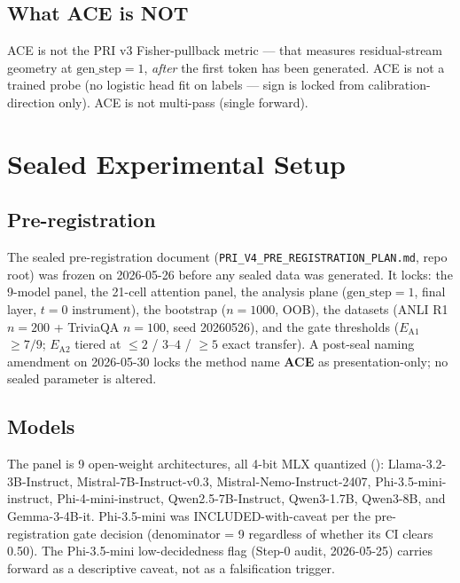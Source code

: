 \documentclass[10pt, letterpaper]{article}
\newcommand{\ea}[1]{$E_{\text{A}#1}$}
\begin{document}
\subsection{What ACE is NOT}
\label{sec:method:not}

ACE is not the PRI v3 Fisher-pullback metric --- that measures
residual-stream geometry at $\text{gen\_step}{=}1$, \emph{after} the
first token has been generated. ACE is not a trained probe (no
logistic head fit on labels --- sign is locked from
calibration-direction only). ACE is not multi-pass (single forward).

\section{Sealed Experimental Setup}
\label{sec:setup}

\subsection{Pre-registration}

The sealed pre-registration document
(\texttt{PRI\_V4\_PRE\_REGISTRATION\_PLAN.md}, repo root) was frozen
on 2026-05-26 before any sealed data was generated. It locks: the
9-model panel, the 21-cell attention panel, the analysis plane
($\text{gen\_step}{=}1$, final layer, $t{=}0$ instrument), the
bootstrap ($n{=}1000$, OOB), the datasets (ANLI R1 $n{=}200$ +
TriviaQA $n{=}100$, seed 20260526), and the gate thresholds
(\ea{1} $\geq 7/9$; \ea{2} tiered at $\leq 2$ / $3$--$4$ / $\geq 5$
exact transfer). A post-seal naming amendment on 2026-05-30 locks the
method name \textbf{ACE} as presentation-only; no sealed parameter is
altered.

\subsection{Models}

The panel is 9 open-weight architectures, all 4-bit MLX quantized
(\citealp{mlxframework}): Llama-3.2-3B-Instruct,
Mistral-7B-Instruct-v0.3, Mistral-Nemo-Instruct-2407,
Phi-3.5-mini-instruct, Phi-4-mini-instruct, Qwen2.5-7B-Instruct,
Qwen3-1.7B, Qwen3-8B, and Gemma-3-4B-it. Phi-3.5-mini was
INCLUDED-with-caveat per the pre-registration gate decision
(denominator = 9 regardless of whether its CI clears 0.50). The
Phi-3.5-mini low-decidedness flag (Step-0 audit, 2026-05-25) carries
forward as a descriptive caveat, not as a falsification trigger.
\end{document}
